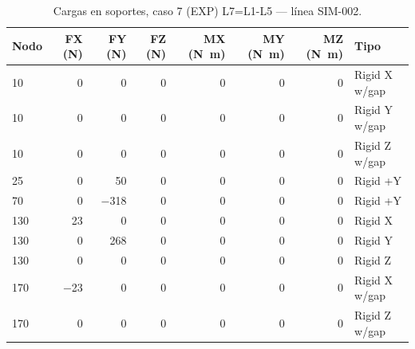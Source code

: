 \begin{table}[htbp]
  \centering
  \footnotesize
  \caption{Cargas en soportes, caso 7 (EXP) L7=L1-L5 — línea SIM-002.}
  \label{tab:restricciones-exp}
  \begin{tabular}{lrrrrrrl}
    \toprule
    Nodo & FX (\si{N}) & FY (\si{N}) & FZ (\si{N}) & MX (\si{N.m}) & MY (\si{N.m}) & MZ (\si{N.m}) & Tipo \\
    \midrule
    10 & \num{0} & \num{0} & \num{0} & \num{0} & \num{0} & \num{0} & Rigid X w/gap \\
    10 & \num{0} & \num{0} & \num{0} & \num{0} & \num{0} & \num{0} & Rigid Y w/gap \\
    10 & \num{0} & \num{0} & \num{0} & \num{0} & \num{0} & \num{0} & Rigid Z w/gap \\
    25 & \num{0} & \num{50} & \num{0} & \num{0} & \num{0} & \num{0} & Rigid +Y \\
    70 & \num{0} & \num{-318} & \num{0} & \num{0} & \num{0} & \num{0} & Rigid +Y \\
    130 & \num{23} & \num{0} & \num{0} & \num{0} & \num{0} & \num{0} & Rigid X \\
    130 & \num{0} & \num{268} & \num{0} & \num{0} & \num{0} & \num{0} & Rigid Y \\
    130 & \num{0} & \num{0} & \num{0} & \num{0} & \num{0} & \num{0} & Rigid Z \\
    170 & \num{-23} & \num{0} & \num{0} & \num{0} & \num{0} & \num{0} & Rigid X w/gap \\
    170 & \num{0} & \num{0} & \num{0} & \num{0} & \num{0} & \num{0} & Rigid Z w/gap \\
    \bottomrule
  \end{tabular}
\end{table}
